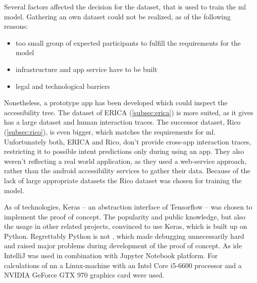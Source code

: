 


Several factors affected the decision for the dataset, that is used to train the \gls{ml} model.
Gathering an own dataset could not be realized, as of the following reasons:
\begin{itemize}
    \item too small group of expected participants to fulfill the requirements for the model
    \item infrastructure and app service have to be built
    \item legal and technological barriers
\end{itemize}
Nonetheless, a prototype app has been developed which could inspect the accessibility tree.
The dataset of ERICA (\ref{subsec:erica}) is more suited, as it gives has a large dataset and human interaction traces.
The successor dataset, Rico (\ref{subsec:rico}), is even bigger, which matches the requirements for \gls{ml}.
Unfortunately both, ERICA and Rico, don't provide cross-app interaction traces, restricting it to possible intent predictions only during using an app.
They also weren't reflecting a real world application, as they used a web-service approach, rather than the android accessibility services to gather their data.
Because of the lack of large appropriate datasets the Rico dataset was chosen for training the model.

As of technologies, Keras -- an abstraction interface of Tensorflow -- was chosen to implement the proof of concept.
The popularity and public knowledge, but also the usage in other related projects, convinced to use Keras, which is built up on Python.
Regrettably Python is not , which made debugging unnecessarily hard and raised major problems during development of the proof of concept.
As \gls{ide} IntelliJ was used in combination with Jupyter Notebook platform.
For calculations of \gls{nn} a Linux-machine with an Intel Core i5-6600 processor and a NVIDIA GeForce GTX 970 graphics card were used.


